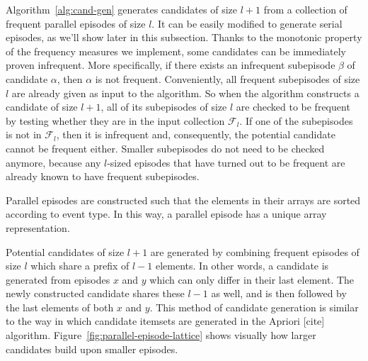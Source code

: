 Algorithm~\ref{alg:cand-gen} generates candidates of size $ l + 1 $ from a collection of frequent parallel episodes of size $ l $. It can be easily modified to generate serial episodes, as we'll show later in this subsection. Thanks to the monotonic property of the frequency measures we implement, some candidates can be immediately proven infrequent. More specifically, if there exists an infrequent subepisode $ \beta $ of candidate $ \alpha $, then $ \alpha $ is not frequent.
Conveniently, all frequent subepisodes of size $ l $ are already given as input to the algorithm. So when the algorithm constructs a candidate of size $ l + 1 $, all of its subepisodes of size $ l $ are checked to be frequent by testing whether they are in the input collection $ \mathcal{F}_l $. If one of the subepisodes is not in $ \mathcal{F}_l $, then it is infrequent and, consequently, the potential candidate cannot be frequent either.
Smaller subepisodes do not need to be checked anymore, because any $ l $-sized episodes that have turned out to be frequent are already known to have frequent subepisodes.

Parallel episodes are constructed such that the elements in their arrays are sorted according to event type. In this way, a parallel episode has a unique array representation.

Potential candidates of size $ l + 1 $ are generated by combining frequent episodes of size $ l $ which share a prefix of $ l - 1 $ elements. In other words, a candidate is generated from episodes $ x $ and $ y $ which can only differ in their last element. The newly constructed candidate shares these $ l - 1 $ as well, and is then followed by the last elements of both $ x $ and $ y $. This method of candidate generation is similar to the way in which candidate itemsets are generated in the Apriori [cite] algorithm. Figure~\ref{fig:parallel-episode-lattice} shows visually how larger candidates build upon smaller episodes.


